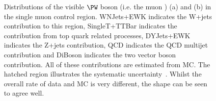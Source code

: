 \begin{figure}
  \caption{Distributions of the visible $\PW$ boson \pt (i.e. the muon \pt) (a) and \METnoMU (b) in the single muon control region. WNJets+EWK indicates the W+jets contribution to this region, SingleT+TTBar indicates the contribution from top quark related processes, DYJets+EWK indicates the Z+jets contribution, \ac{QCD} indicates the \ac{QCD} multijet contribution and DiBoson indicates the two vector boson contribution. All of these contributions are estimated from \ac{MC}. The hatched region illustrates the systematic uncertainty~\cite{ARTICLE:CMSAN-12-403}. Whilst the overall rate of data and \ac{MC} is very different, the shape can be seen to agree well.}
  \label{fig:promptwmunu}
\end{figure}

